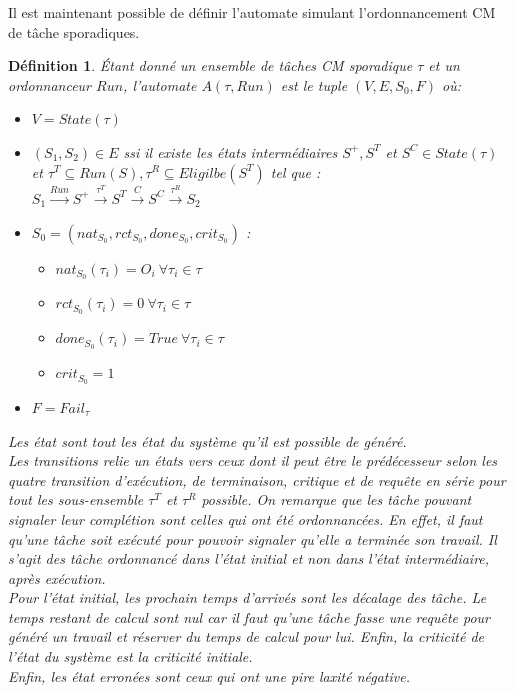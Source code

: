 \documentclass[12pt,a4paper,oneside]{book}
\theoremstyle{break}
\newtheorem{defin}{Définition}[chapter]
\theoremstyle{breakplain}
\begin{document}
Il est maintenant possible de définir l'automate simulant l'ordonnancement CM de tâche sporadiques.

\begin{defin} 
\label{spo:auto}
Étant donné un ensemble de tâches CM sporadique $\tau$ et un ordonnanceur $Run$, l'automate $A(\tau,Run)$ est le tuple $(V, E, S_0, F)$ où:
\begin{itemize}
\item  $V=State(\tau)$
\item $(S_1,S_2) \in E$ ssi il existe les états intermédiaires $S^{+}, S^{T}$ et $S^{C} \in State(\tau)$ et $\tau^T \subseteq Run(S),\tau^R \subseteq Eligilbe(S^{T}) $ tel que : \\$S_1\xrightarrow{Run}S^{+}\xrightarrow{\tau^T}S^{T}\xrightarrow{C}S^{C}\xrightarrow{\tau^R}S_2$
\item $S_0 = (nat_{S_0}, rct_{S_0}, done_{S_0}, crit_{S_0})$ :\begin{itemize}
\item $nat_{S_0}(\tau_i) = O_i\ \forall \tau_i \in \tau$
\item $rct_{S_0}(\tau_i) = 0\ \forall \tau_i \in \tau$
\item $done_{S_0}(\tau_i) = True\ \forall \tau_i \in \tau$
\item $crit_{S_0} = 1$
\end{itemize}
\item $F = Fail_\tau$
\end{itemize}

Les état sont tout les état du système qu'il est possible de généré.\\
Les transitions relie un états vers ceux dont il peut être le prédécesseur selon les quatre transition d'exécution, de terminaison, critique et de requête en série pour tout les sous-ensemble $\tau^T$ et $\tau^R$ possible. On remarque que les tâche pouvant signaler leur complétion sont celles qui ont été ordonnancées. En effet, il faut qu'une tâche soit exécuté pour pouvoir signaler qu'elle a terminée son travail. Il s'agit des tâche ordonnancé dans l'état initial et non dans l'état intermédiaire, après exécution.\\
Pour l'état initial, les prochain temps d'arrivés sont les décalage des tâche. Le temps restant de calcul sont nul car il faut qu'une tâche fasse une requête pour généré un travail et réserver du temps de calcul pour lui. Enfin, la criticité de l'état du système est la criticité initiale.\\
Enfin, les état erronées sont ceux qui ont une pire laxité négative.

\end{defin} 
\end{document}
